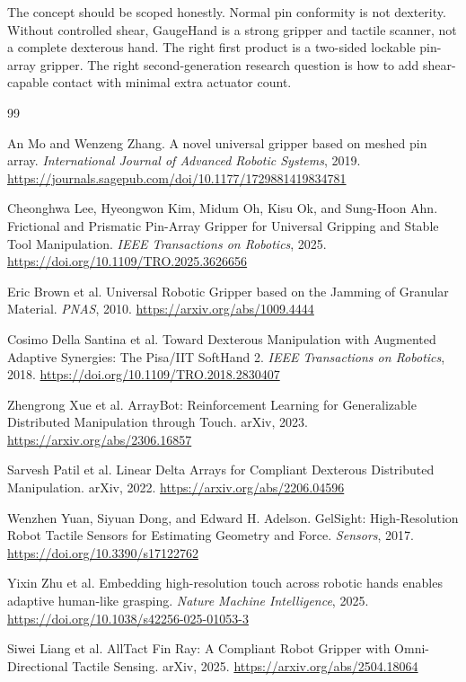 \documentclass[11pt]{article}
\newcommand{\GaugeHand}{GaugeHand}
\begin{document}
The concept should be scoped honestly. Normal pin conformity is not dexterity. Without controlled shear, \GaugeHand{} is a strong gripper and tactile scanner, not a complete dexterous hand. The right first product is a two-sided lockable pin-array gripper. The right second-generation research question is how to add shear-capable contact with minimal extra actuator count.

\begin{thebibliography}{99}
\raggedright
\small

An Mo and Wenzeng Zhang.
A novel universal gripper based on meshed pin array.
\emph{International Journal of Advanced Robotic Systems}, 2019.
\url{https://journals.sagepub.com/doi/10.1177/1729881419834781}

Cheonghwa Lee, Hyeongwon Kim, Midum Oh, Kisu Ok, and Sung-Hoon Ahn.
Frictional and Prismatic Pin-Array Gripper for Universal Gripping and Stable Tool Manipulation.
\emph{IEEE Transactions on Robotics}, 2025.
\url{https://doi.org/10.1109/TRO.2025.3626656}

Eric Brown et al.
Universal Robotic Gripper based on the Jamming of Granular Material.
\emph{PNAS}, 2010.
\url{https://arxiv.org/abs/1009.4444}

Cosimo Della Santina et al.
Toward Dexterous Manipulation with Augmented Adaptive Synergies: The Pisa/IIT SoftHand 2.
\emph{IEEE Transactions on Robotics}, 2018.
\url{https://doi.org/10.1109/TRO.2018.2830407}

Zhengrong Xue et al.
ArrayBot: Reinforcement Learning for Generalizable Distributed Manipulation through Touch.
arXiv, 2023.
\url{https://arxiv.org/abs/2306.16857}

Sarvesh Patil et al.
Linear Delta Arrays for Compliant Dexterous Distributed Manipulation.
arXiv, 2022.
\url{https://arxiv.org/abs/2206.04596}

Wenzhen Yuan, Siyuan Dong, and Edward H. Adelson.
GelSight: High-Resolution Robot Tactile Sensors for Estimating Geometry and Force.
\emph{Sensors}, 2017.
\url{https://doi.org/10.3390/s17122762}

Yixin Zhu et al.
Embedding high-resolution touch across robotic hands enables adaptive human-like grasping.
\emph{Nature Machine Intelligence}, 2025.
\url{https://doi.org/10.1038/s42256-025-01053-3}

Siwei Liang et al.
AllTact Fin Ray: A Compliant Robot Gripper with Omni-Directional Tactile Sensing.
arXiv, 2025.
\url{https://arxiv.org/abs/2504.18064}


\end{thebibliography}
\end{document}
